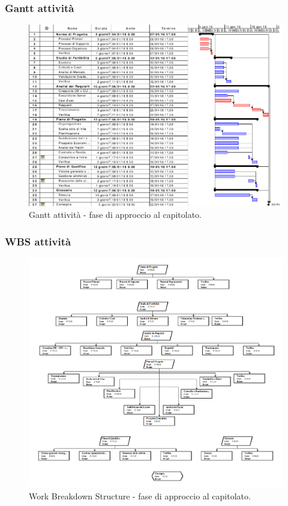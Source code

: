 \documentclass[a4paper]{article}
\begin{document}
			\subsubsection{Gantt attività}
				\begin{figure}[H]
					\centering
					\includegraphics[scale=0.4]{gantt_approccio}
					\caption{Gantt attività - fase di approccio al capitolato.}
				\end{figure}
			\subsubsection{WBS attività}
				\begin{figure}[H]
					\centering
					\includegraphics[scale=0.5]{wbs_approccio}
					\caption{Work Breakdown Structure - fase di approccio al capitolato.}
				\end{figure}
\end{document}
